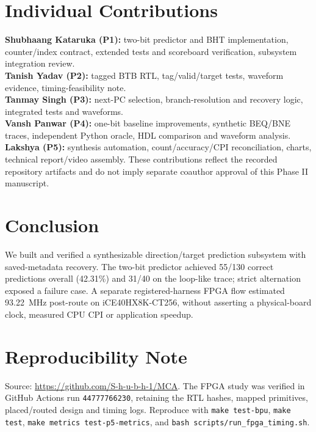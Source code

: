 \documentclass[conference,a4paper]{IEEEtran}
\begin{document}
\balance
\section{Individual Contributions}
\textbf{Shubhaang Kataruka (P1):} two-bit predictor and BHT implementation, counter/index contract, extended tests and scoreboard verification, subsystem integration review.\\
\textbf{Tanish Yadav (P2):} tagged BTB RTL, tag/valid/target tests, waveform evidence, timing-feasibility note.\\
\textbf{Tanmay Singh (P3):} next-PC selection, branch-resolution and recovery logic, integrated tests and waveforms.\\
\textbf{Vansh Panwar (P4):} one-bit baseline improvements, synthetic BEQ/BNE traces, independent Python oracle, HDL comparison and waveform analysis.\\
\textbf{Lakshya (P5):} synthesis automation, count/accuracy/CPI reconciliation, charts, technical report/video assembly. These contributions reflect the recorded repository artifacts and do not imply separate coauthor approval of this Phase II manuscript.

\section{Conclusion}
We built and verified a synthesizable direction/target prediction
subsystem with saved-metadata recovery. The two-bit predictor achieved
55/130 correct predictions overall (42.31\%) and 31/40 on the
loop-like trace; strict alternation exposed a failure case.
A separate registered-harness FPGA flow estimated 93.22~MHz
post-route on iCE40HX8K-CT256, without asserting a physical-board
clock, measured CPU CPI or application speedup.


\section*{Reproducibility Note}
Source: \url{https://github.com/S-h-u-b-h-1/MCA}.
The FPGA study was verified in GitHub Actions run
\texttt{44777766230}, retaining the RTL hashes, mapped primitives,
placed/routed design and timing logs. Reproduce with
\texttt{make test-bpu}, \texttt{make test},
\texttt{make metrics test-p5-metrics}, and
\texttt{bash scripts/run\_fpga\_timing.sh}.
\end{document}
